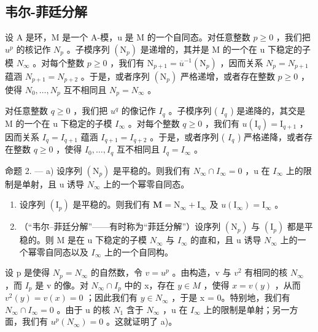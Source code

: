 \subsection{韦尔-菲廷分解}

设 A 是环，M 是一个 A-模，u 是 M 的一个自同态。对任意整数 \(p \geqslant 0\) ，我们把 \(u^{p}\) 的核记作 \(N_{p}\) 。子模序列 \((\mathrm{N}_{p})\) 是递增的，其并是 M 的一个在 u 下稳定的子模 \(N_{\infty}\) 。对每个整数 \(p \geqslant 0\) ，我们有 \(\mathrm{N}_{p+1} = \overline{u}^{-1}(\mathrm{N}_{p})\) ，因而关系 \(N_{p} = N_{p+1}\) 蕴涵 \(N_{p+1} = N_{p+2}\) 。于是，或者序列 \((\mathrm{N}_{p})\) 严格递增，或者存在整数 \(p \geqslant 0\) ，使得 \(N_{0}, \ldots, N_{p}\) 互不相同且 \(N_{p} = N_{\infty}\) 。

对任意整数 \(q \geqslant 0\) ，我们把 \(u^{q}\) 的像记作 \(I_{q}\) 。子模序列 ( \(I_{q}\) ) 是递降的，其交是 M 的一个在 u 下稳定的子模 \(I_{\infty}\) 。对每个整数 \(q \geqslant 0\) ，我们有 \(u(\mathrm{I}_{q}) = \mathrm{I}_{q+1}\) ，因而关系 \(I_{q} = I_{q+1}\) 蕴涵 \(I_{q+1} = I_{q+2}\) 。于是，或者序列 ( \(I_{q}\) ) 严格递降，或者存在整数 \(q \geqslant 0\) ，使得 \(I_{0}, \ldots, I_{q}\) 互不相同且 \(I_{q} = I_{\infty}\) 。

命题 2. --- a) 设序列 \((\mathrm{N}_{p})\) 是平稳的。则我们有 \(N_{\infty} \cap I_{\infty} = 0\) ，u 在 \(I_{\infty}\) 上的限制是单射，且 u 诱导 \(N_{\infty}\) 上的一个幂零自同态。

\begin{enumerate}
\def\labelenumi{\alph{enumi})}
\setcounter{enumi}{1}
\item
  设序列 \((\mathrm{I}_p)\) 是平稳的。则我们有 \(\mathbf{M} = \mathrm{N}_{\infty} + \mathrm{I}_{\infty}\) 及 \(u(\mathrm{I}_{\infty}) = \mathrm{I}_{\infty}\) 。
\item
  （``韦尔--菲廷分解''——有时称为``菲廷分解''）设序列 \((\mathrm{N}_{p})\) 与 \((\mathrm{I}_{p})\) 都是平稳的。则 M 是在 u 下稳定的子模 \(N_{\infty}\) 与 \(I_{\infty}\) 的直和，且 u 诱导 \(N_{\infty}\) 上的一个幂零自同态以及 \(I_{\infty}\) 上的一个自同构。
\end{enumerate}

设 p 是使得 \(N_{p} = N_{\infty}\) 的自然数，令 \(v = u^{p}\) 。由构造，v 与 \(v^{2}\) 有相同的核 \(N_{\infty}\) ，而 \(I_{p}\) 是 v 的像。对 \(N_{\infty} \cap I_{p}\) 中的 x，存在 \(y \in M\) ，使得 \(x = v(y)\) ，从而 \(v^{2}(y) = v(x) = 0\) ；因此我们有 \(y \in N_{\infty}\) ，于是 x = 0。特别地，我们有 \(N_{\infty} \cap I_{\infty} = 0\) 。由于 u 的核 \(N_{1}\) 含于 \(N_{\infty}\) ，u 在 \(I_{\infty}\) 上的限制是单射；另一方面，我们有 \(u^{p}(N_{\infty}) = 0\) 。这就证明了 a)。

